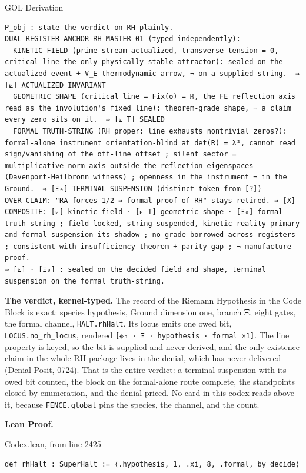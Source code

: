 \documentclass[10pt,twocolumn]{article}
\begin{document}
\begin{golbox}{GOL Derivation}
\begin{lstlisting}[style=golv]
P_obj : state the verdict on RH plainly.
DUAL-REGISTER ANCHOR RH-MASTER-01 (typed independently):
  KINETIC FIELD (prime stream actualized, transverse tension = 0, critical line the only physically stable attractor): sealed on the actualized event + V_E thermodynamic arrow, ¬ on a supplied string.  ⇒ [⟀] ACTUALIZED INVARIANT
  GEOMETRIC SHAPE (critical line = Fix(σ) = ℝ, the FE reflection axis read as the involution's fixed line): theorem-grade shape, ¬ a claim every zero sits on it.  ⇒ [⟀ T] SEALED
  FORMAL TRUTH-STRING (RH proper: line exhausts nontrivial zeros?): formal-alone instrument orientation-blind at det(R) = λ², cannot read sign/vanishing of the off-line offset ; silent sector = multiplicative-norm axis outside the reflection eigenspaces (Davenport-Heilbronn witness) ; openness in the instrument ¬ in the Ground.  ⇒ [Ξ₀] TERMINAL SUSPENSION (distinct token from [?])
OVER-CLAIM: "RA forces 1/2 ⇒ formal proof of RH" stays retired. ⇒ [X]
COMPOSITE: [⟀] kinetic field · [⟀ T] geometric shape · [Ξ₀] formal truth-string ; field locked, string suspended, kinetic reality primary and formal suspension its shadow ; no grade borrowed across registers ; consistent with insufficiency theorem + parity gap ; ¬ manufacture proof.
⇒ [⟀] · [Ξ₀] : sealed on the decided field and shape, terminal suspension on the formal truth-string.
\end{lstlisting}
\end{golbox}

\textbf{The verdict, kernel-typed.} The record of the Riemann Hypothesis
in the Code Block is exact: species hypothesis, Ground dimension one,
branch Ξ, eight gates, the formal channel, \texttt{HALT.rhHalt}. Its
locus emits one owed bit, \texttt{LOCUS.no\_rh\_locus}, rendered
\texttt{{[}⬖₀\ ·\ Ξ\ ·\ hypothesis\ ·\ formal\ ×1{]}}. The line property
is keyed, so the bit is supplied and never derived, and the only
existence claim in the whole RH package lives in the denial, which has
never delivered (Denial Posit, 0724). That is the entire verdict: a
terminal suspension with its owed bit counted, the block on the
formal-alone route complete, the standpoints closed by enumeration, and
the denial priced. No card in this codex reads above it, because
\texttt{FENCE.global} pins the species, the channel, and the count.

\textbf{Lean Proof.}

\begin{leanexcerpt}{Codex.lean, from line 2425}
\begin{lstlisting}[style=leanx,firstnumber=2425]
def rhHalt : SuperHalt := ⟨.hypothesis, 1, .xi, 8, .formal, by decide⟩
\end{lstlisting}
\end{leanexcerpt}
\end{document}
